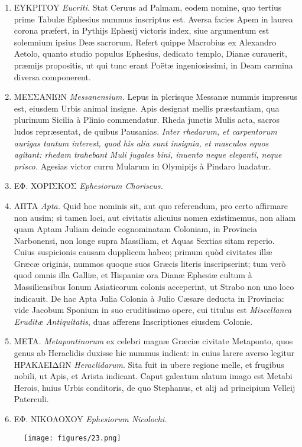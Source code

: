 \documentclass[a4paper, 11pt, oneside, polutonikogreek, latin]{article}
\begin{document}
\begin{enumerate}
    \item \foreignlanguage{greek}{EYKPITOY} \emph{Eucriti.} Stat Ceruus ad Palmam, eodem nomine, quo tertius prime Tabulæ Ephesius nummus inscriptus est. Aversa facies Apem in laurea corona præfert, in Pythijs Ephesij victoris index, siue argumentum est solemnium ipsius Deæ sacrorum. Refert quippe Macrobius ex Alexandro Aetolo, quanto studio populus Ephesius, dedicato templo, Dianæ curauerit, præmijs propositis, ut qui tunc erant Poëtæ ingeniosissimi, in Deam carmina diversa componerent.

    \item \foreignlanguage{greek}{MEΣΣANIΩN} \emph{Messanensium.} Lepus in plerisque Messanæ nummis impressus est, eiusdem Urbis animal insigne. Apis designat mellis præstantiam, qua plurimum Sicilia à Plinio commendatur. Rheda junctis Mulis acta, sacros ludos repræsentat, de quibus Pausanias. \emph{Inter rhedarum, et carpentorum aurigas tantum interest, quod his alia sunt insignia, et masculos equos agitant: rhedam trahebant Muli jugales bini, inuento neque eleganti, neque prisco.} Agesias victor curru Mularum in Olymipijs à Pindaro luadatur.

    \item \foreignlanguage{greek}{EΦ. XOPIΣKOΣ} \emph{Ephesiorum Choriseus.}

    \item \foreignlanguage{greek}{AΠTA} \emph{Apta.} Quid hoc nominis sit, aut quo referendum, pro certo affirmare non ausim; si tamen loci, aut civitatis alicuius nomen existimemus, non aliam quam Aptam Juliam deinde cognominatam Coloniam, in Provincia Narbonensi, non longe supra Massiliam, et Aquas Sextias sitam reperio. Cuius suspicionis causam dupplicem habeo; primum quòd civitates illæ Græcæ originis, nummos quoque suos Græcis literis inscripserint; tum verò quod omnis illa Galliæ, et Hispaniæ ora Dianæ Ephesiæ cultum à Massiliensibus Ionum Asiaticorum colonis acceperint, ut Strabo non uno loco indicauit. De hac Apta Julia Colonia à Julio Cæsare deducta in Provincia: vide Jacobum Sponium in suo eruditissimo opere, cui titulus est \emph{Miscellanea Eruditæ Antiquitatis}, duas afferens Inscriptiones eiusdem Colonie.

    \item \foreignlanguage{greek}{META}. \emph{Metapontinorum} ex celebri magnæ Græciæ civitate Metaponto, quos genus ab Heraclidis duxisse hic nummus indicat: in cuius larere averso legitur \foreignlanguage{greek}{HPAKΛEIΔΩN} \emph{Heraclidarum}. Sita fuit in ubere regione melle, et frugibus nobili, ut Apis, et Arista indicant. Caput galeatum alatum imago est Metabi Herois, huius Urbis conditoris, de quo Stephanus, et alij ad principium Velleij Paterculi.

    \item \foreignlanguage{greek}{EΦ. NIKOΛOXOY} \emph{Ephesiorum Nicolochi.}
\end{enumerate}
\clearpage
\vspace*{\fill}
\begin{figure}[H]
\centering
\texttt{[image: figures/23.png]}
\end{figure}
\vspace*{\fill}
\clearpage
\end{document}
